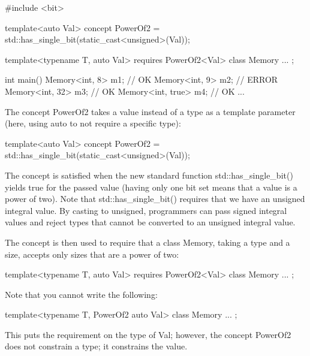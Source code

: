 
\begin{cpp}
#include <bit>

template<auto Val>
concept PowerOf2 = std::has_single_bit(static_cast<unsigned>(Val));

template<typename T, auto Val>
requires PowerOf2<Val>
class Memory {
	...
};

int main()
{
	Memory<int, 8> m1; // OK
	Memory<int, 9> m2; // ERROR
	Memory<int, 32> m3; // OK
	Memory<int, true> m4; // OK
	...
}
\end{cpp}

The concept PowerOf2 takes a value instead of a type as a template parameter (here, using auto to not require a specific type):

\begin{cpp}
template<auto Val>
concept PowerOf2 = std::has_single_bit(static_cast<unsigned>(Val));
\end{cpp}

The concept is satisfied when the new standard function std::has\_single\_bit() yields true for the passed value (having only one bit set means that a value is a power of two). Note that std::has\_single\_bit() requires that we have an unsigned integral value. By casting to unsigned, programmers can pass signed integral values and reject types that cannot be converted to an unsigned integral value.

The concept is then used to require that a class Memory, taking a type and a size, accepts only sizes that are a power of two:

\begin{cpp}
template<typename T, auto Val>
requires PowerOf2<Val>
class Memory {
	...
};
\end{cpp}

Note that you cannot write the following:


\begin{cpp}
template<typename T, PowerOf2 auto Val>
class Memory {
	...
};
\end{cpp}

This puts the requirement on the type of Val; however, the concept PowerOf2 does not constrain a type; it constrains the value.








